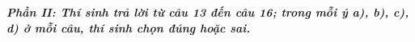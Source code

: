 \documentclass[12pt, a4paper]{article}
\begin{document}
\textit{\textbf{Phần II: Thí sinh trả lời từ câu 13 đến câu 16; trong mỗi ý a), b), c), d) ở mỗi câu, thí sinh chọn đúng hoặc sai.}}

\vspace{0.3cm}







    
    
    
\end{document}
